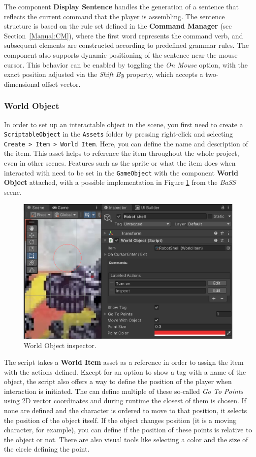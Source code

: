 The component \textbf{Display Sentence} handles the generation of a sentence that reflects the current command that the player is assembling. The sentence structure is based on the rule set defined in the \textbf{Command Manager} (see Section~\ref{Manual:CM}), where the first word represents the command verb, and subsequent elements are constructed according to predefined grammar rules. The component also supports dynamic positioning of the sentence near the mouse cursor. This behavior can be enabled by toggling the \textit{On Mouse} option, with the exact position adjusted via the \textit{Shift By} property, which accepts a two-dimensional offset vector.

\subsubsection{World Object}
\label{Manual:WO}
In order to set up an interactable object in the scene, you first need to create a \verb|ScriptableObject| in the \verb|Assets| folder by pressing right-click and selecting \verb|Create > Item > World Item|. Here, you can define the name and description of the item. This asset helps to reference the item throughout the whole project, even in other scenes. Features such as the sprite or what the item does when interacted with need to be set in the \verb|GameObject| with the component \textbf{World Object} attached, with a possible implementation in Figure \ref{fig:Manual-WO} from the \textit{BaSS} scene. 

\begin{figure}[H]
\centering
\includegraphics[width=.8\linewidth]{img/User doc/world_object.png}
\caption{World Object inspector.}
\label{fig:Manual-WO}
\end{figure}

The script takes a \textbf{World Item} asset as a reference in order to assign the item with the actions defined. Except for an option to show a tag with a name of the object, the script also offers a way to define the position of the player when interaction is initiated. The can define multiple of these so-called \textit{Go To Points} using 2D vector coordinates and during runtime the closest of them is chosen. If none are defined and the character is ordered to move to that position, it selects the position of the object itself. If the object changes position (it is a moving character, for example), you can define if the position of these points is relative to the object or not. There are also visual tools like selecting a color and the size of the circle defining the point.

